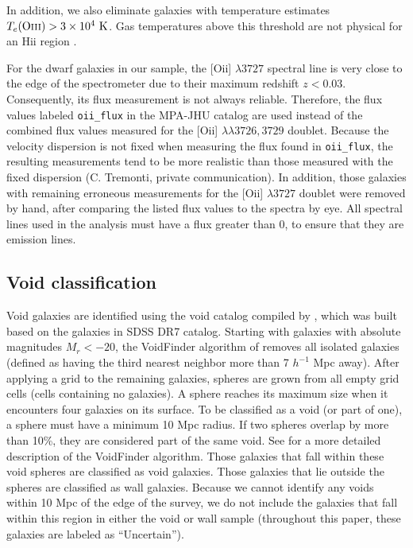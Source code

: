In addition, we also eliminate galaxies with temperature estimates 
$T_e (\text{O{\sc iii}}) > 3\times 10^4\text{ K}$.  Gas temperatures above this 
threshold are not physical for an H{\sc ii} region \citep[inferred 
from][]{Osterbrock89, Izotov06, Luridiana15}.

For the dwarf galaxies in our sample, the [O{\sc ii}] $\lambda 3727$ spectral 
line is very close to the edge of the spectrometer due to their maximum redshift 
$z < 0.03$.  Consequently, its flux measurement is not always reliable.  
Therefore, the flux values labeled \texttt{oii\_flux} in the MPA-JHU catalog are 
used instead of the combined flux values measured for the [O{\sc ii}] 
$\lambda \lambda 3726,3729$ doublet.  Because the velocity dispersion is not 
fixed when measuring the flux found in \texttt{oii\_flux}, the resulting 
measurements tend to be more realistic than those measured with the fixed 
dispersion (C. Tremonti, private communication).  In addition, those galaxies 
with remaining erroneous measurements for the [O{\sc ii}] $\lambda 3727$ 
doublet were removed by hand, after comparing the listed flux values to the 
spectra by eye.  All spectral lines used in the analysis must have a flux 
greater than 0, to ensure that they are emission lines.


\subsection{Void classification}

Void galaxies are identified using the void catalog compiled by \cite{Pan12}, 
which was built based on the galaxies in SDSS DR7 catalog.  Starting with 
galaxies with absolute magnitudes $M_r < -20$, the VoidFinder algorithm of 
\cite{Hoyle02} removes all isolated galaxies (defined as having the third 
nearest neighbor more than 7 $h^{-1}$ Mpc away).  After applying a grid to the 
remaining galaxies, spheres are grown from all empty grid cells (cells 
containing no galaxies).  A sphere reaches its maximum size when it encounters 
four galaxies on its surface.  To be classified as a void (or part of one), a 
sphere must have a minimum 10 Mpc radius.  If two spheres overlap by more than 
10\%, they are considered part of the same void.  See \cite{Hoyle02} for a more 
detailed description of the VoidFinder algorithm.  Those galaxies that fall 
within these void spheres are classified as void galaxies.  Those galaxies that 
lie outside the spheres are classified as wall galaxies.  Because we cannot 
identify any voids within 10 Mpc of the edge of the survey, we do not include 
the galaxies that fall within this region in either the void or wall sample 
(throughout this paper, these galaxies are labeled as ``Uncertain'').

